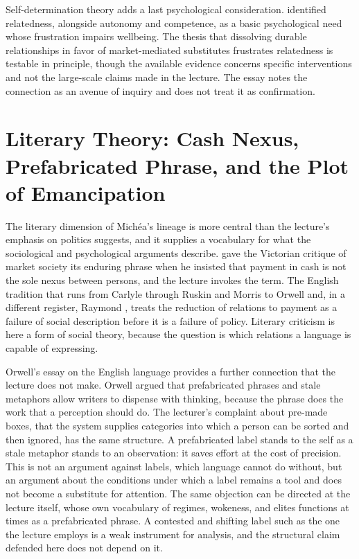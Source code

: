 \documentclass[12pt]{article}
\begin{document}
Self-determination theory adds a last psychological consideration. \citet{deci} identified relatedness, alongside autonomy and competence, as a basic psychological need whose frustration impairs wellbeing. The thesis that dissolving durable relationships in favor of market-mediated substitutes frustrates relatedness is testable in principle, though the available evidence concerns specific interventions and not the large-scale claims made in the lecture. The essay notes the connection as an avenue of inquiry and does not treat it as confirmation.

\section{Literary Theory: Cash Nexus, Prefabricated Phrase, and the Plot of Emancipation}
\label{sec:literary}

The literary dimension of Michéa's lineage is more central than the lecture's emphasis on politics suggests, and it supplies a vocabulary for what the sociological and psychological arguments describe. \citet{carlyle} gave the Victorian critique of market society its enduring phrase when he insisted that payment in cash is not the sole nexus between persons, and the lecture invokes the term. The English tradition that runs from Carlyle through Ruskin and Morris to Orwell and, in a different register, Raymond \citet{williams}, treats the reduction of relations to payment as a failure of social description before it is a failure of policy. Literary criticism is here a form of social theory, because the question is which relations a language is capable of expressing.

Orwell's essay on the English language \citep{orwell46} provides a further connection that the lecture does not make. Orwell argued that prefabricated phrases and stale metaphors allow writers to dispense with thinking, because the phrase does the work that a perception should do. The lecturer's complaint about pre-made boxes, that the system supplies categories into which a person can be sorted and then ignored, has the same structure. A prefabricated label stands to the self as a stale metaphor stands to an observation: it saves effort at the cost of precision. This is not an argument against labels, which language cannot do without, but an argument about the conditions under which a label remains a tool and does not become a substitute for attention. The same objection can be directed at the lecture itself, whose own vocabulary of regimes, wokeness, and elites functions at times as a prefabricated phrase. A contested and shifting label such as the one the lecture employs is a weak instrument for analysis, and the structural claim defended here does not depend on it.
\end{document}
